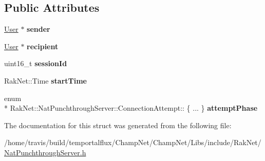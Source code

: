 \subsection*{Public Attributes}
\begin{DoxyCompactItemize}
\item 
\hypertarget{struct_rak_net_1_1_nat_punchthrough_server_1_1_connection_attempt_a613847e4fec9667e31dd4e783f54748b}{\hyperlink{struct_rak_net_1_1_nat_punchthrough_server_1_1_user}{User} $\ast$ {\bfseries sender}}\label{struct_rak_net_1_1_nat_punchthrough_server_1_1_connection_attempt_a613847e4fec9667e31dd4e783f54748b}

\item 
\hypertarget{struct_rak_net_1_1_nat_punchthrough_server_1_1_connection_attempt_a737688d73c69c348a2ef84d777fb34c2}{\hyperlink{struct_rak_net_1_1_nat_punchthrough_server_1_1_user}{User} $\ast$ {\bfseries recipient}}\label{struct_rak_net_1_1_nat_punchthrough_server_1_1_connection_attempt_a737688d73c69c348a2ef84d777fb34c2}

\item 
\hypertarget{struct_rak_net_1_1_nat_punchthrough_server_1_1_connection_attempt_ae8716d2c3a4628ce0cb25f584fb3861e}{uint16\-\_\-t {\bfseries session\-Id}}\label{struct_rak_net_1_1_nat_punchthrough_server_1_1_connection_attempt_ae8716d2c3a4628ce0cb25f584fb3861e}

\item 
\hypertarget{struct_rak_net_1_1_nat_punchthrough_server_1_1_connection_attempt_ac20ded968991f284c3ef3f60aa887dde}{Rak\-Net\-::\-Time {\bfseries start\-Time}}\label{struct_rak_net_1_1_nat_punchthrough_server_1_1_connection_attempt_ac20ded968991f284c3ef3f60aa887dde}

\item 
\hypertarget{struct_rak_net_1_1_nat_punchthrough_server_1_1_connection_attempt_af1c1a6c9f15dfee5a274dbfc50855785}{enum \\*
Rak\-Net\-::\-Nat\-Punchthrough\-Server\-::\-Connection\-Attempt\-:: \{ ... \}  {\bfseries attempt\-Phase}}\label{struct_rak_net_1_1_nat_punchthrough_server_1_1_connection_attempt_af1c1a6c9f15dfee5a274dbfc50855785}

\end{DoxyCompactItemize}


The documentation for this struct was generated from the following file\-:\begin{DoxyCompactItemize}
\item 
/home/travis/build/temportalflux/\-Champ\-Net/\-Champ\-Net/\-Libs/include/\-Rak\-Net/\hyperlink{_nat_punchthrough_server_8h}{Nat\-Punchthrough\-Server.\-h}\end{DoxyCompactItemize}
